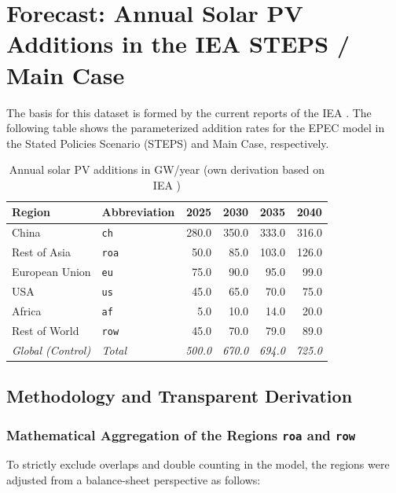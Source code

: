 \documentclass[11pt,a4paper]{article}
\begin{document}
\newpage
\section{Forecast: Annual Solar PV Additions in the IEA STEPS / Main Case}

The basis for this dataset is formed by the current reports of the IEA \cite{iea_weo_2024, iea_renewables_2025}. The following table shows the parameterized addition rates for the EPEC model in the Stated Policies Scenario (STEPS) and Main Case, respectively.

\begin{table}[htpb]
\centering
\begin{tabular}{llrrrr}
\toprule
\textbf{Region} & \textbf{Abbreviation} & \textbf{2025} & \textbf{2030} & \textbf{2035} & \textbf{2040} \\
\midrule
China & \texttt{ch} & 280.0 & 350.0 & 333.0 & 316.0 \\
Rest of Asia & \texttt{roa} & 50.0 & 85.0 & 103.0 & 126.0 \\
European Union & \texttt{eu} & 75.0 & 90.0 & 95.0 & 99.0 \\
USA & \texttt{us} & 45.0 & 65.0 & 70.0 & 75.0 \\
Africa & \texttt{af} & 5.0 & 10.0 & 14.0 & 20.0 \\
Rest of World & \texttt{row} & 45.0 & 70.0 & 79.0 & 89.0 \\
\midrule
\textit{Global (Control)} & \textit{Total} & \textit{500.0} & \textit{670.0} & \textit{694.0} & \textit{725.0} \\
\bottomrule
\end{tabular}
\caption{Annual solar PV additions in GW/year (own derivation based on IEA \cite{iea_weo_2024, iea_renewables_2025})}
\label{tab:pv_demand}
\end{table}

\subsection{Methodology and Transparent Derivation}

\subsubsection{Mathematical Aggregation of the Regions \texttt{roa} and \texttt{row}}
To strictly exclude overlaps and double counting in the model, the regions were adjusted from a balance-sheet perspective as follows:
\end{document}
